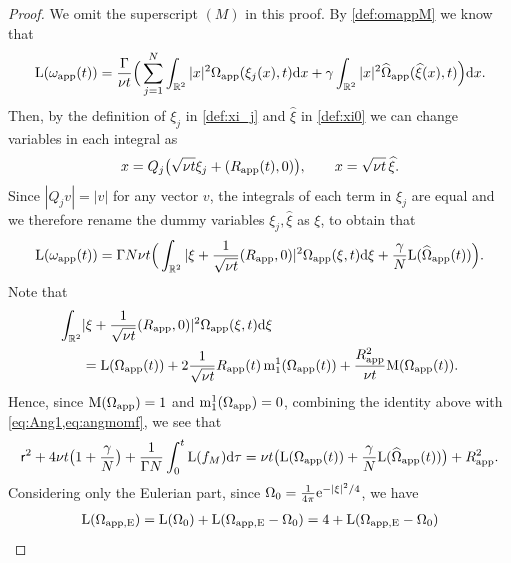 \documentclass[11pt,reqno,a4paper]{amsart}
\def\dd{{\rm d}}
\def\e{{\rm e}}
\def\RR {\mathbb{R}}
\newcommand{\mrm}{\mathrm{m}}
\newcommand{\mrM}{\mathrm{M}}
\newcommand{\1}{\mathbbm{1}}
\theoremstyle{definition}
\theoremstyle{definition}
\numberwithin{equation}{section}
\begin{document}
\begin{proof}
        We omit the superscript $(M)$ in this proof. By \cref{def:omappM} we know that
    \begin{align}
        \mathrm{L}(\omega_{\rm app}(t))=\frac{\Gamma}{\nu t}\Big(\sum_{j=1}^N\int_{\RR^2} |x|^2\Omega_{\rm app}(\xi_j(x),t)\dd x+\gamma \int_{\RR^2}|x|^2\widehat{\Omega}_{\rm app}(\widehat{\xi}(x),t)\Big)\dd x.
    \end{align}
    Then, by the definition of $\xi_j$ in \cref{def:xi_j} and $\widehat{\xi}$ in \cref{def:xi0} we can change variables in each integral as 
    \begin{align}
        x=Q_j\big(\sqrt{\nu t}\xi_j+(R_{\rm app}(t),0)\big), \qquad x=\sqrt{\nu t}\, \widehat{\xi}.
    \end{align}
    Since $|Q_jv|=|v|$ for any vector $v$, the integrals of each term in $\xi_j$ are equal and we therefore rename the dummy variables $\xi_j,\widehat{\xi}$ as $\xi$, to obtain that
    \begin{align}
    \label{eq:Ang1}
        \mathrm{L}(\omega_{\rm app}(t))=\Gamma N \nu t\Big( \int_{\RR^2}|\xi+\frac{1}{\sqrt{\nu t}}(R_{\rm app},0)|^2\Omega_{\rm app}(\xi,t)\dd \xi+\frac{\gamma}{N}\mathrm{L}(\widehat{\Omega}_{\rm app}(t))\Big).
    \end{align}
    Note that
\begin{align}
    \int_{\RR^2}&|\xi+\frac{1}{\sqrt{\nu t}}(R_{\rm app},0)|^2\Omega_{\rm app}(\xi,t)\dd \xi
\\
\label{eq:AngOmapp}
&=\mathrm{L}(\Omega_{\rm app}(t))+2\frac{1}{\sqrt{\nu t}}R_{\rm app}(t)\, \mrm^1_1(\Omega_{\rm app}(t))+\frac{R_{\rm app}^2}{\nu t}\mrM(\Omega_{\rm app}(t)).
\end{align}
Hence, since $\mrM(\Omega_{\rm app})=1$ and $\mrm^1_1(\Omega_{\rm app})=0$, combining the identity above with  \cref{eq:Ang1,eq:angmomf}, we see that
\begin{align}
\label{eq:Ang2}
    \mathsf{r}^2+4\nu t\big(1+\frac{\gamma}{N}\big)+\frac{1}{\Gamma N}\int_0^t \mathrm{L}(f_M)\dd \tau=\nu t \big(\mathrm{L}(\Omega_{\rm app}(t))+\frac{\gamma}{N}\mathrm{L}(\widehat{\Omega}_{\rm app}(t))\big)+R_{\rm app}^2.
\end{align}
 Considering only the Eulerian part, since $\Omega_0=\frac{1}{4\pi}\e^{-|\xi|^2/4}$, we have
\begin{align}
    \mathrm{L}(\Omega_{\rm app,E})=\mathrm{L}(\Omega_0)+\mathrm{L}(\Omega_{\rm app,E}-\Omega_0)=4+\mathrm{L}(\Omega_{\rm app,E}-\Omega_0)
\end{align}

\end{proof}
\end{document}
